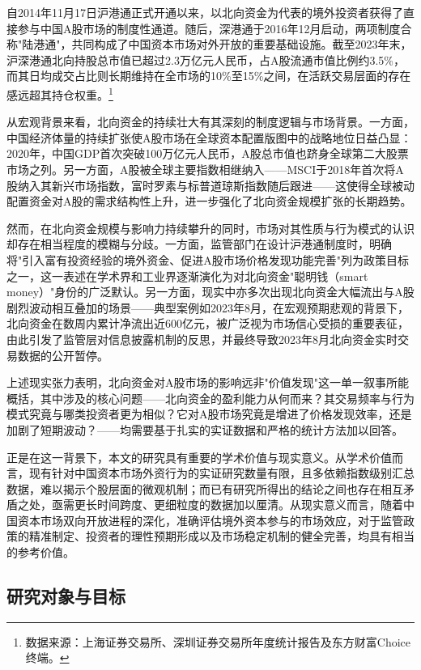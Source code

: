 \documentclass{article}
\begin{document}
自2014年11月17日沪港通正式开通以来，以北向资金为代表的境外投资者获得了直接参与中国A股市场的制度性通道。随后，深港通于2016年12月启动，两项制度合称"陆港通"，共同构成了中国资本市场对外开放的重要基础设施。截至2023年末，沪深港通北向持股总市值已超过2.3万亿元人民币，占A股流通市值比例约3.5\%，而其日均成交占比则长期维持在全市场的10\%至15\%之间，在活跃交易层面的存在感远超其持仓权重。\footnote{数据来源：上海证券交易所、深圳证券交易所年度统计报告及东方财富Choice终端。}

从宏观背景来看，北向资金的持续壮大有其深刻的制度逻辑与市场背景。一方面，中国经济体量的持续扩张使A股市场在全球资本配置版图中的战略地位日益凸显：2020年，中国GDP首次突破100万亿元人民币，A股总市值也跻身全球第二大股票市场之列。另一方面，A股被全球主要指数相继纳入——MSCI于2018年首次将A股纳入其新兴市场指数，富时罗素与标普道琼斯指数随后跟进——这使得全球被动配置资金对A股的需求结构性上升，进一步强化了北向资金规模扩张的长期趋势。

然而，在北向资金规模与影响力持续攀升的同时，市场对其性质与行为模式的认识却存在相当程度的模糊与分歧。一方面，监管部门在设计沪港通制度时，明确将"引入富有投资经验的境外资金、促进A股市场价格发现功能完善"列为政策目标之一，这一表述在学术界和工业界逐渐演化为对北向资金"聪明钱（smart money）"身份的广泛默认。另一方面，现实中亦多次出现北向资金大幅流出与A股剧烈波动相互叠加的场景——典型案例如2023年8月，在宏观预期悲观的背景下，北向资金在数周内累计净流出近600亿元，被广泛视为市场信心受损的重要表征，由此引发了监管层对信息披露机制的反思，并最终导致2023年8月北向资金实时交易数据的公开暂停。

上述现实张力表明，北向资金对A股市场的影响远非"价值发现"这一单一叙事所能概括，其中涉及的核心问题——北向资金的盈利能力从何而来？其交易频率与行为模式究竟与哪类投资者更为相似？它对A股市场究竟是增进了价格发现效率，还是加剧了短期波动？——均需要基于扎实的实证数据和严格的统计方法加以回答。

正是在这一背景下，本文的研究具有重要的学术价值与现实意义。从学术价值而言，现有针对中国资本市场外资行为的实证研究数量有限，且多依赖指数级别汇总数据，难以揭示个股层面的微观机制；而已有研究所得出的结论之间也存在相互矛盾之处，亟需更长时间跨度、更细粒度的数据加以厘清。从现实意义而言，随着中国资本市场双向开放进程的深化，准确评估境外资本参与的市场效应，对于监管政策的精准制定、投资者的理性预期形成以及市场稳定机制的健全完善，均具有相当的参考价值。

\subsection{研究对象与目标}
\end{document}
